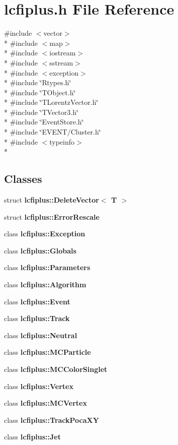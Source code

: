 \section{lcfiplus.\-h File Reference}
\label{lcfiplus_8h}
{\ttfamily \#include $<$vector$>$}\\*
{\ttfamily \#include $<$map$>$}\\*
{\ttfamily \#include $<$iostream$>$}\\*
{\ttfamily \#include $<$sstream$>$}\\*
{\ttfamily \#include $<$exception$>$}\\*
{\ttfamily \#include \char`\"{}Rtypes.\-h\char`\"{}}\\*
{\ttfamily \#include \char`\"{}T\-Object.\-h\char`\"{}}\\*
{\ttfamily \#include \char`\"{}T\-Lorentz\-Vector.\-h\char`\"{}}\\*
{\ttfamily \#include \char`\"{}T\-Vector3.\-h\char`\"{}}\\*
{\ttfamily \#include \char`\"{}Event\-Store.\-h\char`\"{}}\\*
{\ttfamily \#include \char`\"{}E\-V\-E\-N\-T/\-Cluster.\-h\char`\"{}}\\*
{\ttfamily \#include $<$typeinfo$>$}\\*
\subsection*{Classes}
\begin{DoxyCompactItemize}
\item 
struct {\bf lcfiplus\-::\-Delete\-Vector$<$ T $>$}
\item 
struct {\bf lcfiplus\-::\-Error\-Rescale}
\item 
class {\bf lcfiplus\-::\-Exception}
\item 
class {\bf lcfiplus\-::\-Globals}
\item 
class {\bf lcfiplus\-::\-Parameters}
\item 
class {\bf lcfiplus\-::\-Algorithm}
\item 
class {\bf lcfiplus\-::\-Event}
\item 
class {\bf lcfiplus\-::\-Track}
\item 
class {\bf lcfiplus\-::\-Neutral}
\item 
class {\bf lcfiplus\-::\-M\-C\-Particle}
\item 
class {\bf lcfiplus\-::\-M\-C\-Color\-Singlet}
\item 
class {\bf lcfiplus\-::\-Vertex}
\item 
class {\bf lcfiplus\-::\-M\-C\-Vertex}
\item 
class {\bf lcfiplus\-::\-Track\-Poca\-X\-Y}
\item 
class {\bf lcfiplus\-::\-Jet}
\end{DoxyCompactItemize}
